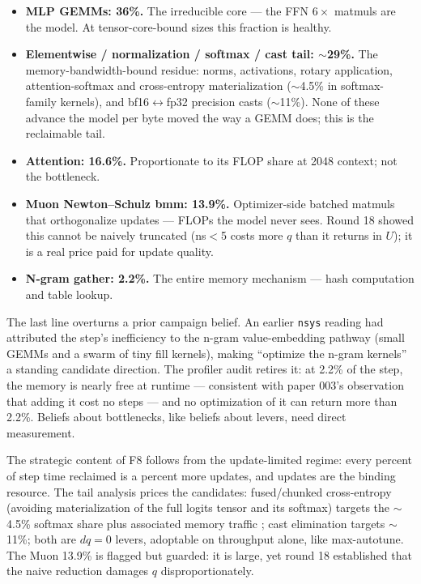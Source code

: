 \documentclass{article}
\begin{document}
\begin{itemize}
    \item \textbf{MLP GEMMs: 36\%.} The irreducible core --- the FFN $6\times$ matmuls are the model. At tensor-core-bound sizes this fraction is healthy.
    \item \textbf{Elementwise / normalization / softmax / cast tail: $\sim$29\%.} The memory-bandwidth-bound residue: norms, activations, rotary application, attention-softmax and cross-entropy materialization ($\sim$4.5\% in softmax-family kernels), and bf16$\leftrightarrow$fp32 precision casts ($\sim$11\%). None of these advance the model per byte moved the way a GEMM does; this is the reclaimable tail.
    \item \textbf{Attention: 16.6\%.} Proportionate to its FLOP share at 2048 context; not the bottleneck.
    \item \textbf{Muon Newton--Schulz bmm: 13.9\%.} Optimizer-side batched matmuls that orthogonalize updates --- FLOPs the model never sees. Round 18 showed this cannot be naively truncated (ns$<$5 costs more $q$ than it returns in $U$); it is a real price paid for update quality.
    \item \textbf{N-gram gather: 2.2\%.} The entire memory mechanism --- hash computation and table lookup.
\end{itemize}

The last line overturns a prior campaign belief. An earlier \texttt{nsys} reading had attributed the step's inefficiency to the n-gram value-embedding pathway (small GEMMs and a swarm of tiny fill kernels), making ``optimize the n-gram kernels'' a standing candidate direction. The profiler audit retires it: at 2.2\% of the step, the memory is nearly free at runtime --- consistent with paper 003's observation that adding it cost no steps --- and no optimization of it can return more than 2.2\%. Beliefs about bottlenecks, like beliefs about levers, need direct measurement.

The strategic content of F8 follows from the update-limited regime: every percent of step time reclaimed is a percent more updates, and updates are the binding resource. The tail analysis prices the candidates: fused/chunked cross-entropy (avoiding materialization of the full logits tensor and its softmax) targets the $\sim$4.5\% softmax share plus associated memory traffic \cite{hsu2024liger}; cast elimination targets $\sim$11\%; both are $dq = 0$ levers, adoptable on throughput alone, like max-autotune. The Muon 13.9\% is flagged but guarded: it is large, yet round 18 established that the naive reduction damages $q$ disproportionately.
\end{document}
